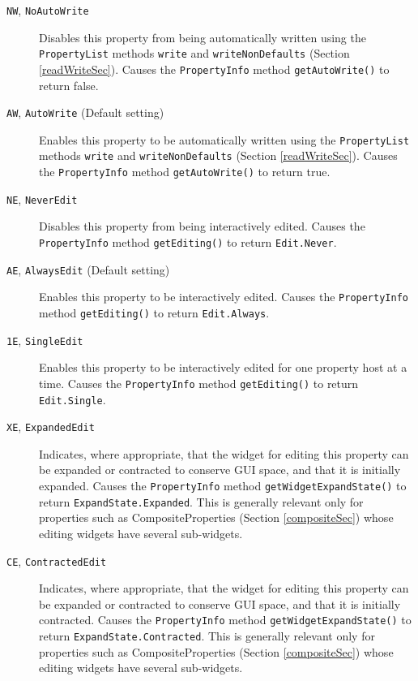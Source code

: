 \begin{description}

\item[{\tt NW}, {\tt NoAutoWrite}] \mbox{}

Disables this property from being
automatically written using the {\tt PropertyList} methods {\tt write}
and {\tt writeNonDefaults} (Section \ref{readWriteSec}). Causes
the {\tt PropertyInfo} method {\tt getAutoWrite()} to return false.

\item[{\tt AW}, {\tt AutoWrite} (Default setting)] \mbox{}

Enables this property to be
automatically written using the {\tt PropertyList} methods {\tt write}
and {\tt writeNonDefaults} (Section \ref{readWriteSec}). Causes the
{\tt PropertyInfo} method {\tt getAutoWrite()} to return true.

\item[{\tt NE}, {\tt NeverEdit}] \mbox{}

Disables this property from being
interactively edited.  Causes the {\tt PropertyInfo} method 
{\tt getEditing()} to return {\tt Edit.Never}.

\item[{\tt AE}, {\tt AlwaysEdit} (Default setting)] \mbox{}

Enables this
property to be interactively edited. 
Causes the {\tt PropertyInfo} method {\tt getEditing()} to return 
{\tt Edit.Always}.

\item[{\tt 1E}, {\tt SingleEdit}] \mbox{}

Enables this property to be
interactively edited for one property host at a time.  Causes the 
{\tt PropertyInfo} method {\tt getEditing()} to return {\tt Edit.Single}.

\item[{\tt XE}, {\tt ExpandedEdit}] \mbox{}

Indicates, where appropriate, that the widget
for editing this property can be expanded or contracted to conserve
GUI space, and that it is initially expanded.  Causes the
{\tt PropertyInfo} method {\tt getWidgetExpandState()} to return
{\tt ExpandState.Expanded}.  This is generally relevant only for
properties such as CompositeProperties (Section \ref{compositeSec}) whose
editing widgets have several sub-widgets.

\item[{\tt CE}, {\tt ContractedEdit}] \mbox{}

Indicates, where appropriate, that the widget
for editing this property can be expanded or contracted to conserve
GUI space, and that it is initially contracted.  Causes the
{\tt PropertyInfo} method {\tt getWidgetExpandState()} to return
{\tt ExpandState.Contracted}.  This is generally relevant only for
properties such as CompositeProperties (Section \ref{compositeSec}) whose
editing widgets have several sub-widgets.


\end{description}
